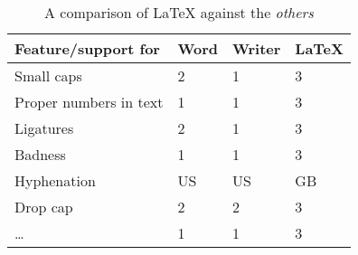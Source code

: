 \begin{table}[h]
\begin{center}
	\begin{tabular}{ | l | l | l | l | }
		\hline
		Feature/support for & Word & Writer & LaTeX \\
		\hline
		Small caps	&2	& 1	& 3 \\
		Proper numbers in text&	 1	& 1	& 3\\
		Ligatures	& 2	 &1	& 3\\
		Badness	& 1	& 1	& 3\\
		Hyphenation	& US	& US	&GB\\
		Drop cap	 &2	 &2	& 3\\
		\ldots	& 1	& 1	& 3\\
		\hline
	\end{tabular}
	\end{center}
	\caption{A comparison of LaTeX against the \emph{others}}
	\label{tab:LatexComparison}
\end{table}	